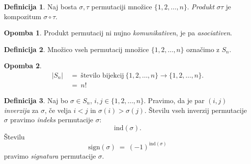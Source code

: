 \documentclass[11pt]{article}
\newcommand{\0}{\mathbf{0}}
\newcommand{\ind}{\text{ind}}
\newcommand{\sgn}{\text{sign}}
\theoremstyle{definition}
\newtheorem{definicija}{Definicija}[section]
\theoremstyle{definition}
\theoremstyle{definition}
\theoremstyle{definition}
\newtheorem*{opomba}{Opomba}
\begin{document}
\begin{definicija}

Naj bosta $\sigma,\tau$ permutaciji množice $\{1,2,\ldots, n\}$. \textit{Produkt} $\sigma\tau$ je kompozitum $\sigma \circ \tau$.

\end{definicija}
\vspace{0.5cm}

\begin{opomba}

Produkt permutacij ni nujno \textit{komunikativen}, je pa \textit{asociativen}.

\end{opomba}
\vspace{0.5cm}

\begin{definicija}

Množico vseh permutacij množice $\{1, 2, \ldots, n\}$ označimo z $S_n$.

\end{definicija}
\vspace{0.5cm}

\begin{opomba}

\begin{align*}
|S_n| ~&=~ \text{število bijekcij}~ \{1, 2, \ldots, n\} \rightarrow \{1, 2, \ldots, n\}. \\
&=~ n!
\end{align*}

\end{opomba}
\vspace{0.5cm}

\begin{definicija}

Naj bo $\sigma \in S_n$, $i,j \in \{1, 2, \ldots, n\}$. Pravimo, da je par $(i, j)$ \textit{inverzija} za $\sigma$, če velja $i<j$ in $\sigma(i) > \sigma(j)$. Številu vseh inverzij permutacije $\sigma$ pravimo \textit{indeks} permutacije $\sigma$:
$$\ind{(\sigma)}.$$
Številu $$\sgn(\sigma) ~=~ (-1)^{\ind{(\sigma)}}$$
pravimo \textit{signatura} permutacije $\sigma$.

\end{definicija}
\vspace{0.5cm}
\end{document}
